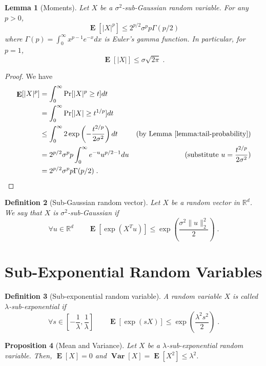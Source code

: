 \documentclass[12pt]{article}
\newtheorem{definition}{Definition}
\newtheorem{proposition}[definition]{Proposition}
\newtheorem{lemma}[definition]{Lemma}
\newcommand{\R}{\mathbb{R}}
\newcommand{\norm}[1]{\|{#1}\|}
\DeclareMathOperator*{\Var}{\mathbf{Var}}
\DeclareMathOperator*{\Exp}{\mathbf{E}}
\begin{document}
\begin{lemma}[Moments]
\label{lemma:sub-gaussian-moments}
Let $X$ be a $\sigma^2$-sub-Gaussian random variable. For any $p > 0$,
$$
\Exp\left[ \left|X\right|^p \right] \le 2^{p/2} \sigma^p p \Gamma(p/2)
$$
where $\Gamma(p) = \int_0^\infty x^{p-1} e^{-x} dx$ is Euler's gamma function.
In particular, for $p=1$,
$$
\Exp[|X|] \le \sigma \sqrt{2 \pi} \; .
$$
\end{lemma}

\begin{proof}
We have
\begin{align*}
\Exp[|X|^p]
& = \int_0^\infty \Pr[|X|^p \ge t] dt \\
& = \int_0^\infty \Pr[|X| \ge t^{1/p}] dt \\
& \le \int_0^\infty 2\exp\left( - \frac{t^{2/p}}{2 \sigma^2} \right) dt & \text{(by Lemma~\ref{lemma:tail-probability})} \\
& = 2^{p/2} \sigma^p p \int_0^\infty e^{-u} u^{p/2-1} du & \text{(substitute $u=\frac{t^{2/p}}{2\sigma^2}$)} \\
& = 2^{p/2} \sigma^p p \Gamma(p/2) \; .
\end{align*}
\end{proof}

\begin{definition}[Sub-Gaussian random vector]
Let $X$ be a random vector in $\R^d$. We say that $X$ is \emph{$\sigma^2$-sub-Gaussian}
if
$$
\forall u \in \R^d \qquad
\Exp\left[ \exp \left( X^T u \right) \right]
\le \exp\left( \frac{\sigma^2 \norm{u}_2^2}{2} \right) \; .
$$
\end{definition}

\section{Sub-Exponential Random Variables}

\begin{definition}[Sub-exponential random variable]
A random variable $X$ is called $\lambda$-sub-exponential if
$$
\forall s \in \left[ - \frac{1}{\lambda}, \frac{1}{\lambda} \right] \qquad
\Exp\left[ \exp \left( s X \right) \right]
\le \exp\left( \frac{\lambda^2 s^2}{2} \right) \; .
$$
\end{definition}

\begin{proposition}[Mean and Variance]
Let $X$ be a $\lambda$-sub-exponential random variable.
Then, $\Exp[X] = 0$ and $\Var[X] = \Exp[X^2] \le \lambda^2$.
\end{proposition}
\end{document}
